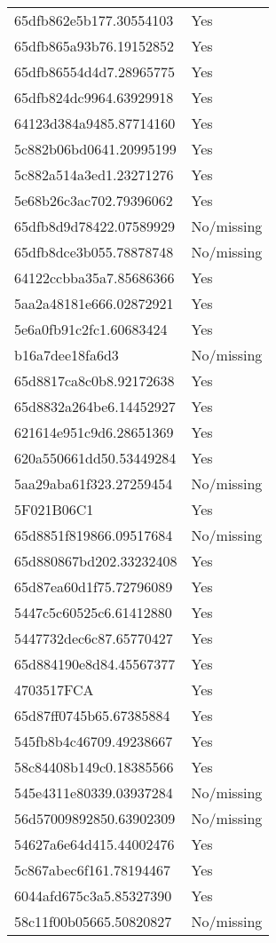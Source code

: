 \begin{tabular}{ll}
65dfb862e5b177.30554103 & Yes \\
65dfb865a93b76.19152852 & Yes \\
65dfb86554d4d7.28965775 & Yes \\
65dfb824dc9964.63929918 & Yes \\
64123d384a9485.87714160 & Yes \\
5c882b06bd0641.20995199 & Yes \\
5c882a514a3ed1.23271276 & Yes \\
5e68b26c3ac702.79396062 & Yes \\
65dfb8d9d78422.07589929 & No/missing \\
65dfb8dce3b055.78878748 & No/missing \\
64122ccbba35a7.85686366 & Yes \\
5aa2a48181e666.02872921 & Yes \\
5e6a0fb91c2fc1.60683424 & Yes \\
b16a7dee18fa6d3 & No/missing \\
65d8817ca8c0b8.92172638 & Yes \\
65d8832a264be6.14452927 & Yes \\
621614e951c9d6.28651369 & Yes \\
620a550661dd50.53449284 & Yes \\
5aa29aba61f323.27259454 & No/missing \\
5F021B06C1 & Yes \\
65d8851f819866.09517684 & No/missing \\
65d880867bd202.33232408 & Yes \\
65d87ea60d1f75.72796089 & Yes \\
5447c5c60525c6.61412880 & Yes \\
5447732dec6c87.65770427 & Yes \\
65d884190e8d84.45567377 & Yes \\
4703517FCA & Yes \\
65d87ff0745b65.67385884 & Yes \\
545fb8b4c46709.49238667 & Yes \\
58c84408b149c0.18385566 & Yes \\
545e4311e80339.03937284 & No/missing \\
56d57009892850.63902309 & No/missing \\
54627a6e64d415.44002476 & Yes \\
5c867abec6f161.78194467 & Yes \\
6044afd675c3a5.85327390 & Yes \\
58c11f00b05665.50820827 & No/missing \\

\end{tabular}

